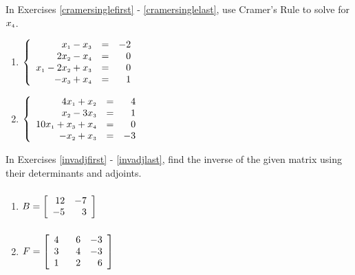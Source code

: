 \documentclass{ximera}
\begin{document}
In Exercises \ref{cramersinglefirst} - \ref{cramersinglelast},  use Cramer's Rule to solve for $x_{\mbox{\tiny$4$}}$.


\begin{multicols}{2}
\begin{enumerate}
\setcounter{enumi}{\value{HW}}

\item $\left\{ \begin{array}{rcr} x_{\mbox{\tiny$1$}} - x_{\mbox{\tiny$3$}} & = & -2 \\ 
2x_{\mbox{\tiny$2$}} - x_{\mbox{\tiny$4$}} & = & 0  \\  
x_{\mbox{\tiny$1$}} -  2x_{\mbox{\tiny$2$}} + x_{\mbox{\tiny$3$}} & = & 0 \\
-x_{\mbox{\tiny$3$}} + x_{\mbox{\tiny$4$}} & = & 1  \end{array} \right.$  \label{cramersinglefirst}

\item $\left\{ \begin{array}{rcr} 4x_{\mbox{\tiny$1$}} + x_{\mbox{\tiny$2$}} & = & 4 \\ 
x_{\mbox{\tiny$2$}} - 3x_{\mbox{\tiny$3$}} & = & 1  \\  
10x_{\mbox{\tiny$1$}} +x_{\mbox{\tiny$3$}} + x_{\mbox{\tiny$4$}} & = & 0 \\
-x_{\mbox{\tiny$2$}} + x_{\mbox{\tiny$3$}} & = & -3  \end{array} \right.$  \label{cramersinglelast}

\setcounter{HW}{\value{enumi}}
\end{enumerate}
\end{multicols}

\pagebreak

In Exercises \ref{invadjfirst} - \ref{invadjlast}, find the inverse of the given matrix using their determinants and adjoints.

\begin{multicols}{2}
\begin{enumerate}
\setcounter{enumi}{\value{HW}}

\item $B = \left[ \begin{array}{rr} 12 & -7 \\ -5 & 3 \end{array} \right] \vphantom{\left[ \begin{array}{rrr} 4 & \hphantom{-}6 & -3 \\ 3 & 4 & -3 \\ 1 & 2 & 6 \end{array} \right]}$ \label{invadjfirst}
\item $F = \left[ \begin{array}{rrr} 4 & \hphantom{-}6 & -3 \\ 3 & 4 & -3 \\ 1 & 2 & 6 \end{array} \right]$ \label{invadjlast}

\setcounter{HW}{\value{enumi}}
\end{enumerate}
\end{multicols}
\end{document}
